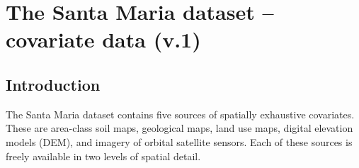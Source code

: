 
\artigofalse
\chapter{The Santa Maria dataset -- covariate data (v.1)}
\label{apen:covar-data}

\tocless\section{Introduction}
\label{sec:covar-data-intro}

The Santa Maria dataset contains five sources of spatially exhaustive covariates. These are 
area-class soil maps, geological maps, land use maps, digital elevation models (DEM), and 
imagery of orbital satellite sensors. Each of these sources is freely available in two levels of 
spatial detail.




